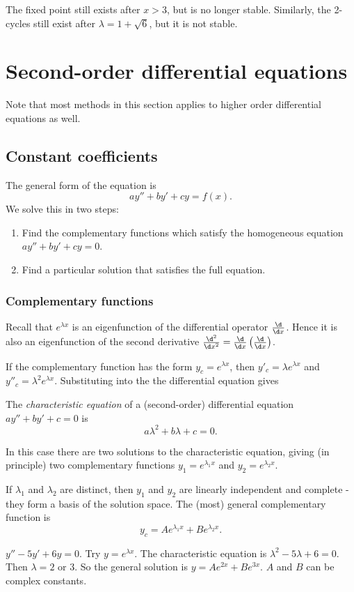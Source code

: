 \documentclass[a4paper]{article}
\begin{document}
\note The fixed point still exists after $x > 3$, but is no longer stable. Similarly, the 2-cycles still exist after $\lambda = 1 + \sqrt{6}$, but it is not stable.

\section{Second-order differential equations}
Note that most methods in this section applies to higher order differential equations as well.
\subsection{Constant coefficients}
The general form of the equation is 
\[
ay'' + by' + cy = f(x).
\]
We solve this in two steps:
\begin{enumerate}
\item Find the complementary functions which satisfy the homogeneous equation $ay'' + by' + cy = 0$.
\item Find a particular solution that satisfies the full equation.
\end{enumerate}
\subsubsection{Complementary functions}
Recall that $e^{\lambda x}$ is an eigenfunction of the differential operator $\frac{\d}{\d x}$. Hence it is also an eigenfunction of the second derivative $\frac{\d^2}{\d x^2} = \frac{\d}{\d x}\left(\frac{\d }{\d x}\right)$.

If the complementary function has the form $y_c = e^{\lambda x}$, then $y'_c = \lambda e^{\lambda x}$ and $y''_c = \lambda^2 e^{\lambda x}$. Substituting into the the differential equation gives
\begin{defi}
  The \emph{characteristic equation} of a (second-order) differential equation $ay'' + by' + c = 0$ is
\[
a\lambda^2 + b\lambda + c = 0.
\]
\end{defi}

 In this case there are two solutions to the characteristic equation, giving (in principle) two complementary functions $y_1 = e^{\lambda_1 x}$ and $y_2 = e^{\lambda_2 x}$.

If $\lambda_1$ and $\lambda_2$ are distinct, then $y_1$ and $y_2$ are linearly independent and complete - they form a basis of the solution space. The (most) general complementary function is
\[
y_c = Ae^{\lambda_1 x} + Be^{\lambda_2 x}.
\]
\begin{eg}
  $y'' - 5y' + 6y = 0$. Try $y = e^{\lambda x}$. The characteristic equation is $\lambda^2 - 5\lambda + 6 = 0$. Then $\lambda = 2$ or $3$. So the general solution is $y = Ae^{2x} + Be^{3x}$.
\note $A$ and $B$ can be complex constants.
\end{eg}
\end{document}
